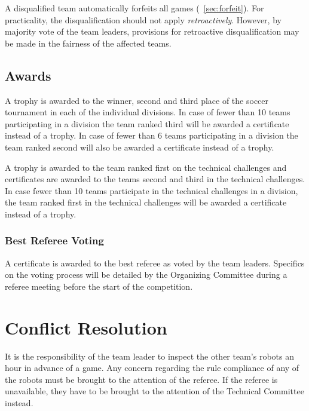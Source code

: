 A disqualified team automatically forfeits all games (\cf~\cref{sec:forfeit}).
For practicality, the disqualification should not apply \textit{retroactively}.
However, by majority vote of the team leaders, provisions for retroactive disqualification may be made in the fairness of the affected teams.

\subsection{Awards}
\label{awards}

A trophy is awarded to the winner, second and third place of the soccer tournament in each of the individual divisions. In case of fewer than 10 teams participating in a division the team ranked third will be awarded a certificate instead	of a trophy. In case of fewer than 6 teams participating in a division the team ranked second will also be awarded a certificate instead of a trophy.

A trophy is awarded to the team ranked first on the technical challenges and certificates
are awarded to the teams second and third in the technical challenges. In case fewer than 10 teams participate in the technical challenges in a division, the team ranked first in the technical challenges will be awarded a certificate instead of a trophy. 

\subsubsection{Best Referee Voting}

A certificate is awarded to the best referee as voted by the team leaders.
Specifics on the voting process will be detailed by the Organizing Committee during a referee meeting before the start of the competition.



\section{Conflict Resolution}
It is the responsibility of the team leader to inspect the other team’s robots an hour in advance of a game. Any concern regarding the rule compliance of any of the robots must be brought to the attention of the referee. If the referee is unavailable, they have to be brought to the attention of the Technical Committee instead.	

